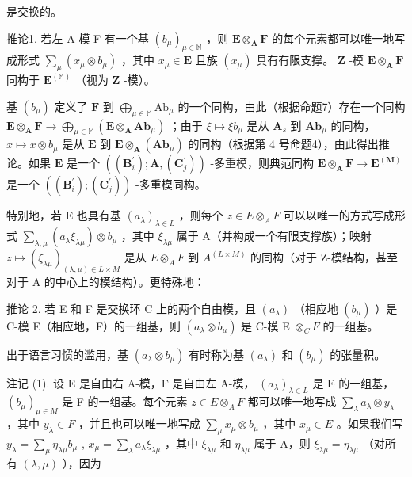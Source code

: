 是交换的。

推论1. 若左 A-模 F 有一个基 \((b_{\mu})_{\mu \in \mathbb{M}}\) ，则 \(\mathbf{E} \otimes_{\mathbf{A}} \mathbf{F}\) 的每个元素都可以唯一地写成形式 \(\sum_{\mu} (x_{\mu} \otimes b_{\mu})\) ，其中 \(x_{\mu} \in \mathbf{E}\) 且族 \((x_{\mu})\) 具有有限支撑。 \(\mathbf{Z}\) -模 \(\mathbf{E} \otimes_{\mathbf{A}} \mathbf{F}\) 同构于 \(\mathbf{E}^{(\mathbb{M})}\) （视为 \(\mathbf{Z}\) -模）。

基 \((b_{\mu})\) 定义了 \(\mathbf{F}\) 到 \(\bigoplus_{\mu \in \mathbb{M}}\mathrm{Ab}_{\mu}\) 的一个同构，由此（根据命题7）存在一个同构 \(\mathbf{E} \otimes_{\mathbf{A}}\mathbf{F} \to \bigoplus_{\mu \in \mathbb{M}}(\mathbf{E} \otimes_{\mathbf{A}}\mathbf{Ab}_{\mu})\) ；由于 \(\xi \mapsto \xi b_{\mu}\) 是从 \(\mathbf{A}_s\) 到 \(\mathbf{Ab}_{\mu}\) 的同构， \(x \mapsto x \otimes b_{\mu}\) 是从 \(\mathbf{E}\) 到 \(\mathbf{E} \otimes_{\mathbf{A}} (\mathbf{Ab}_{\mu})\) 的同构（根据第 4 号命题4），由此得出推论。如果 \(\mathbf{E}\) 是一个 \(((\mathbf{B}_i^{\prime}); \mathbf{A}, (\mathbf{C}_j^{\prime}))\) -多重模，则典范同构 \(\mathbf{E} \otimes_{\mathbf{A}} \mathbf{F} \to \mathbf{E}^{(\mathbf{M})}\) 是一个 \(((\mathbf{B}_i^{\prime}); (\mathbf{C}_j^{\prime}))\) -多重模同构。

特别地，若 E 也具有基 \((a_{\lambda})_{\lambda \in L}\) ，则每个 \(z \in E \otimes_{A} F\) 可以以唯一的方式写成形式 \(\sum_{\lambda, \mu} (a_{\lambda} \xi_{\lambda \mu}) \otimes b_{\mu}\) ，其中 \(\xi_{\lambda \mu}\) 属于 A（并构成一个有限支撑族）；映射 \(z \mapsto (\xi_{\lambda \mu})_{(\lambda, \mu) \in L \times M}\) 是从 \(E \otimes_{A} F\) 到 \(A^{(L \times M)}\) 的同构（对于 Z-模结构，甚至对于 A 的中心上的模结构）。更特殊地：

推论 2. 若 E 和 F 是交换环 C 上的两个自由模，且 \((a_{\lambda})\) （相应地 \((b_{\mu})\) ）是 C-模 E（相应地，F）的一组基，则 \((a_{\lambda} \otimes b_{\mu})\) 是 C-模 E \(\otimes_{C} F\) 的一组基。

出于语言习惯的滥用，基 \((a_{\lambda} \otimes b_{\mu})\) 有时称为基 \((a_{\lambda})\) 和 \((b_{\mu})\) 的张量积。

注记 (1). 设 E 是自由右 A-模，F 是自由左 A-模， \((a_{\lambda})_{\lambda \in L}\) 是 E 的一组基， \((b_{\mu})_{\mu \in M}\) 是 F 的一组基。每个元素 \(z \in E \otimes_{A} F\) 都可以唯一地写成 \(\sum_{\lambda} a_{\lambda} \otimes y_{\lambda}\) ，其中 \(y_{\lambda} \in F\) ，并且也可以唯一地写成 \(\sum_{\mu} x_{\mu} \otimes b_{\mu}\) ，其中 \(x_{\mu} \in E\) 。如果我们写 \(y_{\lambda} = \sum_{\mu} \eta_{\lambda \mu} b_{\mu}\) , \(x_{\mu} = \sum_{\lambda} a_{\lambda} \xi_{\lambda \mu}\) ，其中 \(\xi_{\lambda \mu}\) 和 \(\eta_{\lambda \mu}\) 属于 A，则 \(\xi_{\lambda \mu} = \eta_{\lambda \mu}\) （对所有 \((\lambda, \mu)\) ），因为

